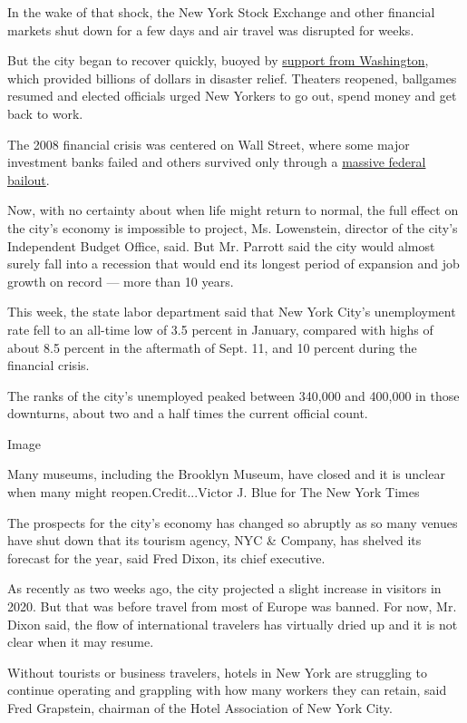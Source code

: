 In the wake of that shock, the New York Stock Exchange and other
financial markets shut down for a few days and air travel was disrupted
for weeks.

But the city began to recover quickly, buoyed by
\href{https://www.nytimes3xbfgragh.onion/2002/12/30/nyregion/after-9-11-parcels-of-money-and-dismay.html}{support
from Washington}, which provided billions of dollars in disaster relief.
Theaters reopened, ballgames resumed and elected officials urged New
Yorkers to go out, spend money and get back to work.

The 2008 financial crisis was centered on Wall Street, where some major
investment banks failed and others survived only through a
\href{https://www.nytimes3xbfgragh.onion/2008/10/03/business/worldbusiness/03iht-bailout.4.16679355.html}{massive
federal bailout}.

Now, with no certainty about when life might return to normal, the full
effect on the city's economy is impossible to project, Ms. Lowenstein,
director of the city's Independent Budget Office, said. But Mr. Parrott
said the city would almost surely fall into a recession that would end
its longest period of expansion and job growth on record --- more than
10 years.

This week, the state labor department said that New York City's
unemployment rate fell to an all-time low of 3.5 percent in January,
compared with highs of about 8.5 percent in the aftermath of Sept. 11,
and 10 percent during the financial crisis.

The ranks of the city's unemployed peaked between 340,000 and 400,000 in
those downturns, about two and a half times the current official count.

Image

Many museums, including the Brooklyn Museum, have closed and it is
unclear when many might reopen.Credit...Victor J. Blue for The New York
Times

The prospects for the city's economy has changed so abruptly as so many
venues have shut down that its tourism agency, NYC \& Company, has
shelved its forecast for the year, said Fred Dixon, its chief executive.

As recently as two weeks ago, the city projected a slight increase in
visitors in 2020. But that was before travel from most of Europe was
banned. For now, Mr. Dixon said, the flow of international travelers has
virtually dried up and it is not clear when it may resume.

Without tourists or business travelers, hotels in New York are
struggling to continue operating and grappling with how many workers
they can retain, said Fred Grapstein, chairman of the Hotel Association
of New York City.

